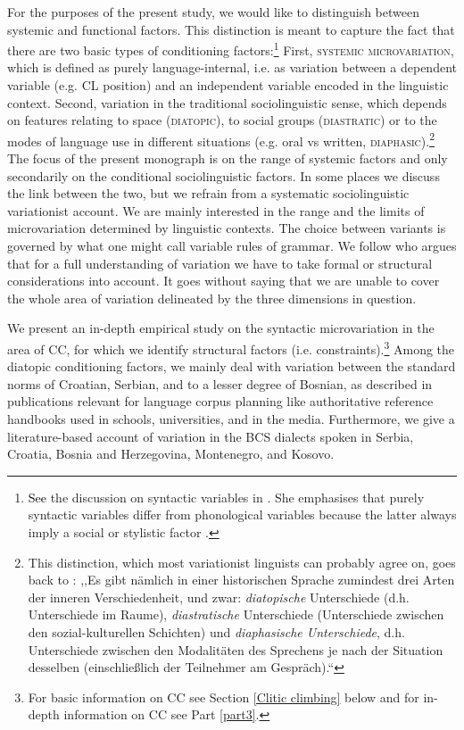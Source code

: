 \noindent For the purposes of the present study, we would like to distinguish between systemic and functional factors. This distinction is meant to capture the fact that there are two basic types of conditioning factors:\footnote{\textcolor{black}{See} the discussion on syntactic variables in \citet{Romaine81}. She emphasises that purely syntactic variables differ from phonological variables because the latter always imply a social or stylistic factor \citep[cf.][15]{Romaine81}.} First, \textsc{systemic microvariation}, which is defined as purely language-internal, i.e. as variation between a dependent variable (e.g. CL position) and an independent variable encoded in the linguistic context. Second, variation in the traditional sociolinguistic sense, which depends on features relating to space (\textsc{diatopic}), to social groups (\textsc{dia\-stra\-tic}) or to the modes of language use in different situations (e.g. oral vs written, \textsc{diaphasic}).\footnote{This distinction, which most variationist linguists can probably agree on, goes back to \citet[111]{Coseriu80}: ,,Es gibt nämlich in einer historischen Sprache zumindest drei Arten der inneren Verschiedenheit, und zwar: \textit{diatopische} Unterschiede (d.h. Unterschiede im Raume), \textit{diastratische} Unterschiede (Unterschiede zwischen den sozial-kulturellen Schichten) und \textit{diaphasische Unterschiede}, d.h. Unterschiede zwischen den Modalitäten des Sprechens je nach der Situation desselben (einschließlich der Teilnehmer am Gespräch).“} The focus of the present monograph is on the range of systemic factors and only secondarily on the conditional sociolinguistic factors. In some places we discuss the link between the two, but we refrain from a systematic sociolinguistic variationist account. We are mainly interested in the range and the limits of microvariation determined by linguistic contexts. The choice between variants is governed by what one might call variable rules of grammar. We follow \citet[141]{Walker10} who argues that for a full understanding of variation we have to take formal or structural considerations into account. It goes without saying that we are  unable to cover the whole area of variation delineated by the three dimensions in question. 

We present an in-depth empirical study on the syntactic microvariation in the area of CC, for which we identify structural factors (i.e. constraints).\footnote{For basic information on CC see Section \ref{Clitic climbing} below and for in-depth information on CC see Part \ref{part3}.} Among the diatopic conditioning factors, we mainly deal with variation between the standard norms of Croatian, Serbian, and to a lesser degree of Bosnian, as described in publications relevant for language corpus planning like authoritative reference handbooks used in schools, universities, and in the media. Furthermore, we give a literature-based account of variation in the BCS dialects spoken in Serbia, Croatia, Bosnia and Herzegovina, Montenegro, and Kosovo.

